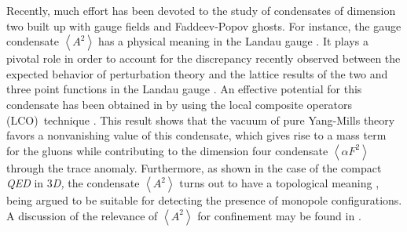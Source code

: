 \documentclass[a4paper,12pt]{article}
\begin{document}
Recently, much effort has been devoted to the study of condensates of
dimension two built up with gauge fields and Faddeev-Popov ghosts. For
instance, the gauge condensate $\left\langle A^{2}\right\rangle \;$has a
physical meaning in the Landau gauge \cite{gz,vb}. It plays a pivotal role
in order to account for the discrepancy recently observed between the
expected behavior of perturbation theory and the lattice results of the two
and three point functions in the Landau gauge \cite{b23, gz1}. An effective
potential for this condensate has been obtained in \cite{v1} by using the
local composite operators (LCO)\ technique \cite{v2,v3}. This result shows
that the vacuum of pure Yang-Mills theory favors a nonvanishing value of
this condensate, which gives rise to a mass term for the gluons while
contributing to the dimension four condensate $\left\langle \alpha
F^{2}\right\rangle $ through the trace anomaly. Furthermore, as shown in the
case of the compact \textit{QED }in 3\textit{D, }the condensate $%
\left\langle A^{2}\right\rangle $ turns out to have a topological meaning 
\cite{gz}, being argued to be suitable for detecting the presence of
monopole configurations. A discussion of the relevance of $\left\langle
A^{2}\right\rangle $ for confinement may be found in \cite{conf}.
\end{document}
